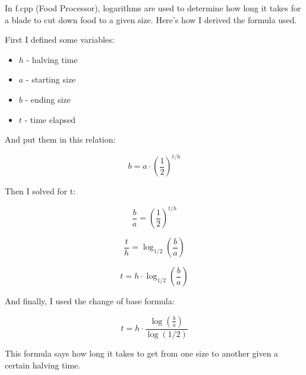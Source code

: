 \documentclass{article}
\author{Marcin Anforowicz}
\begin{document}
In f.cpp (Food Processor), logarithms are used to determine how long it takes for a blade to cut down food to a given size. Here's how I derived the formula used.


First I defined some variables:
\begin{itemize}
\item $h$ - halving time
\item $a$ - starting size
\item $b$ - ending size
\item $t$ - time elapsed
\end{itemize}

And put them in this relation:

$$ b = a \cdot \left( \frac{1}{2} \right) ^{t/h} $$

Then I solved for t:

$$ \frac{b}{a} = \left( \frac{1}{2} \right) ^{t/h} $$

$$ \frac{t}{h} = \log_{1/2} \left( \frac{b}{a} \right) $$

$$ t = h \cdot \log_{1/2} \left( \frac{b}{a} \right) $$

And finally, I used the change of base formula:

$$ t = h \cdot \frac{\log \left( \frac{b}{a} \right)}{\log(1/2)} $$

This formula says how long it takes to get from one size to another given a certain halving time.
\end{document}
